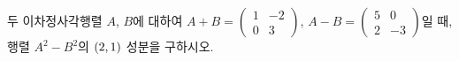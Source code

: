 두 이차정사각행렬 $A$, $B$에 대하여 $A+B=\begin{pmatrix} 1 & -2 \\ 0 & 3 \end{pmatrix}$, $A-B=\begin{pmatrix} 5 & 0 \\ 2 & -3 \end{pmatrix}$일 때, 행렬 $A^2-B^2$의 $(2{,}\mkern3mu\mathopen{}1)$ 성분을 구하시오.
